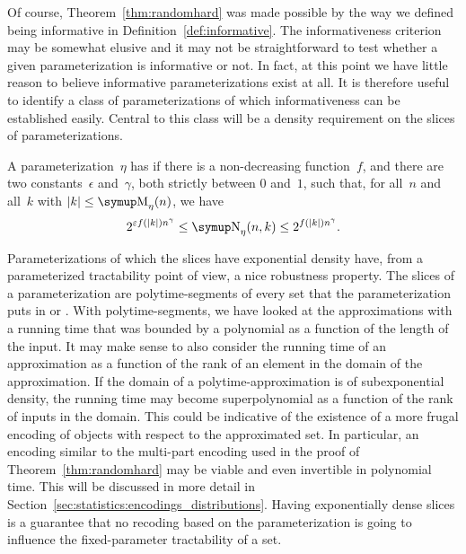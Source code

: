 Of course, Theorem~\ref{thm:randomhard} was made possible by the way we defined being informative in Definition~\ref{def:informative}.
The informativeness criterion may be somewhat elusive and it may not be straightforward to test whether a given parameterization is informative or not.
In fact, at this point we have little reason to believe informative parameterizations exist at all.
It is therefore useful to identify a class of parameterizations of which informativeness can be established easily.
Central to this class will be a density requirement on the slices of parameterizations.
\begin{definition}
  A parameterization~$\eta$ has  if there is a non-decreasing function~$f$, and there are two constants~$\epsilon$ and~$\gamma$, both strictly between $0$ and~$1$, such that, for all~$n$ and all~$k$ with $\length{k} \le \upM_\eta(n)$, we have
\begin{equation*}
  2^{\epsilon f(\length{k}) n^\gamma} \le \upN_\eta(n, k) \le 2^{f(\length{k}) n^\gamma}.
\end{equation*}
\end{definition}

Parameterizations of which the slices have exponential density have, from a parameterized tractability point of view, a nice robustness property.
The slices of a parameterization are polytime-segments of every set that the parameterization puts in  or .
With polytime-segments, we have looked at the approximations with a running time that was bounded by a polynomial as a function of the length of the input.
It may make sense to also consider the running time of an approximation as a function of the rank of an element in the domain of the approximation.
If the domain of a polytime-approximation is of subexponential density, the running time may become superpolynomial as a function of the rank of inputs in the domain.
This could be indicative of the existence of a more frugal encoding of objects with respect to the approximated set.
In particular, an encoding similar to the multi-part encoding used in the proof of Theorem~\ref{thm:randomhard} may be viable and even invertible in polynomial time.
This will be discussed in more detail in Section~\ref{sec:statistics:encodings_distributions}.
Having exponentially dense slices is a guarantee that no recoding based on the parameterization is going to influence the fixed-parameter tractability of a set.

